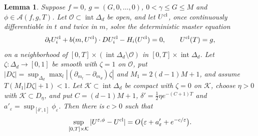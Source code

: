 \documentclass[11pt]{article}
\newtheorem{lemma}{Lemma}
\newcommand{\eps}{\varepsilon}
\newcommand{\cA}{\mathcal A}
\begin{document}
\begin{lemma}\label{consistency}
Suppose $f=0$, $g=(G,0,\ldots,0)$, $0<\gamma\le G\le M$ and $\phi\in\cA(f,g,T)$. Let $\mathcal O\subset\operatorname{int}\Delta_d$ be open, and let $U^{\rm cl}$, once continuously differentiable in $t$ and twice in $m$, solve the deterministic master equation
\[
 \partial_tU^{\rm cl}_i+b(m,U^{\rm cl})\cdot DU^{\rm cl}_i-H_i(U^{\rm cl})=0,\qquad U^{\rm cl}(T)=g,
\]
on a neighborhood of $[0,T]\times(\operatorname{int}\Delta_d\setminus\mathcal O)$ in $[0,T]\times\operatorname{int}\Delta_d$. Let $\zeta:\Delta_d\to[0,1]$ be smooth with $\zeta=1$ on $\mathcal O$, put $|D\zeta|=\sup_{\Delta_d}\max_l|(\partial_{m_l}-\partial_{m_d})\zeta|$ and $M_1=2(d-1)M+1$, and assume $T(M_1|D\zeta|+1)<1$. Let $\mathcal K\subset\operatorname{int}\Delta_d$ be compact with $\zeta=0$ on $\mathcal K$, choose $\eta>0$ with $\mathcal K\subset D_\eta$, and put $C=(d-1)M+1$, $\delta'=\frac12\eta e^{-(C+1)T}$ and $a'_\eps=\sup_{[\delta',1]}\phi_\eps$. Then there is $c>0$ such that
\begin{equation}\label{localclassical}
 \sup_{[0,T]\times\mathcal K}|U^{\eps,\phi}-U^{\rm cl}|=O\big(\eps+a'_\eps+e^{-c/\eps}\big).
\end{equation}
\end{lemma}
\end{document}
